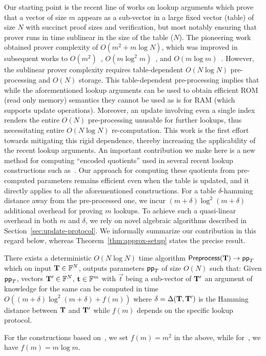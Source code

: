  Our starting point is the recent line of works on lookup arguments which prove
that a vector of size $m$ appears as
a sub-vector in a large fixed vector (table) of size $N$ with succinct proof sizes and verification, but most notably
ensuring that prover runs in time sublinear in the size of the table ($N$). The pioneering work~\cite{CCS:ZBKMNS22}
obtained prover complexity of $O(m^2+m\log N)$, which was improved in subsequent works to $O(m^2)$~\cite{EPRINT:PosKat22},
$O(m\log^2 m)$~\cite{EPRINT:ZGKMR22}, and $O(m\log m)$~\cite{EPRINT:EagFioGab22,PKC:CFFLL24}. However, the sublinear prover
complexity requires table-dependent $O(N\log N)$ pre-processing and $O(N)$ storage. This table-dependent
pre-processing implies that while
the aforementioned lookup arguments can be used to obtain efficient ROM (read only memory) semantics
they cannot be used as is for RAM (which supports update operations).
Moreover, an update involving even a single
index renders the entire $O(N)$ pre-processing unusable for further lookups,
thus necessitating entire $O(N\log N)$ re-computation. This work is the first effort towards
mitigating this rigid dependence, thereby increasing the applicability of the recent lookup arguments.
An important contribution we make here is a new method for computing ``encoded quotients'' used in several
recent lookup constructions such as~\cite{CCS:ZBKMNS22,EPRINT:PosKat22,EPRINT:EagFioGab22,PKC:CFFLL24}.
Our approach for computing these quotients from pre-computed parameters remains efficient even when
the table is updated, and it directly applies to all the aforementioned constructions.
For a table $\delta$-hamming distance away from the pre-processed one, we incur
$(m+\delta)\log^2(m+\delta)$ additional overhead for proving $m$ lookups. To achieve such a quasi-linear overhead in both $m$ and $\delta$, we rely on novel algebraic algorithms described in Section~\ref{sec:update-protocol}.
We informally summarize our contribution in this regard below, whereas Theorem~\ref{thm:approx-setup}
states the precise result.
\begin{theorem}[Informal]\label{thm:pre-process}
	There exists a deterministic $O(N\log N)$ time algorithm $\textsf{Preprocess}(\mathbf{T})\rightarrow \mathsf{pp}_T$
	which on input $\mathbf{T}\in \mathbb{F}^N$, outputs parameters $\mathsf{pp}_T$ of size $O(N)$ such
	that: Given $\mathsf{pp}_T$, vectors $\mathbf{T}'\in \mathbb{F}^N$, $\mathbf{t}\in \mathbb{F}^m$ with $\vec{t}$ being a sub-vector of $\mathbf{T}'$
	an argument of knowledge for the same can be computed in time
	$O((m+\delta)\log^2 (m+\delta) + f(m))$ where $\delta=\Delta(\mathbf{T}, \mathbf{T}')$
	is the Hamming distance between $\mathbf{T}$ and $\mathbf{T}'$ while $f(m)$ depends on the specific lookup protocol.
\end{theorem}
For the constructions based on~\cite{CCS:ZBKMNS22,EPRINT:PosKat22}, we set $f(m)=m^2$ in the above,
while for~\cite{EPRINT:EagFioGab22,PKC:CFFLL24}, we have $f(m)=m\log m$.

